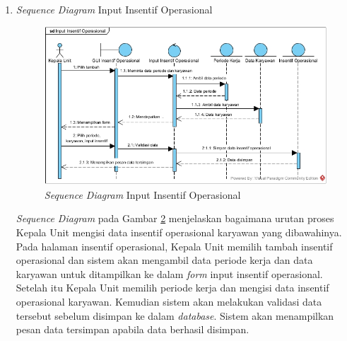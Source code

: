 \begin{enumerate}
\begin{enumerate}[label=\alph*.]
\begin{figure}[H]
            		    \caption{\emph{Sequence Diagram} Lihat Data Penilaian Kinerja}
            		    \label{sequence_lihat_penilaian}
            		\end{figure}
            		\emph{Sequence Diagram} pada Gambar \ref{sequence_lihat_penilaian} menjelaskan bagaimana urutan proses karyawan melihat data penilaian kinerja. Pertama karyawan memilih lihat data penilaian dan sistem akan mengambil data periode kerja dari dalam \emph{database} untuk ditampilkan pada \emph{form}. Setelah itu karyawan dapat memilih periode kerja sebagai parameter. Kemudian sistem mengambil data penilaian kinerja karyawan tersebut berdasarkan periode kerja yang telah dipilih sebelumnya. \newpage
            	\end{enumerate}
			        
            	\item \emph{Sequence Diagram} Input Insentif Operasional
            	    \begin{figure}[H]
            		    \centering
            		    \includegraphics[width=14cm]{gambar/sequence/input-insentif-operasional}
            		    \caption{\emph{Sequence Diagram} Input Insentif Operasional}
            		    \label{sequence_input_insentif}
            		\end{figure}
            		\emph{Sequence Diagram} pada Gambar \ref{sequence_input_insentif} menjelaskan bagaimana urutan proses Kepala Unit mengisi data insentif operasional karyawan yang dibawahinya. Pada halaman insentif operasional, Kepala Unit memilih tambah insentif operasional dan sistem akan mengambil data periode kerja dan data karyawan untuk ditampilkan ke dalam \emph{form} input insentif operasional. Setelah itu Kepala Unit memilih periode kerja dan mengisi data insentif operasional karyawan. Kemudian sistem akan melakukan validasi data tersebut sebelum disimpan ke dalam \emph{database}. Sistem akan menampilkan pesan data tersimpan apabila data berhasil disimpan. \newpage
			        

\end{enumerate}
